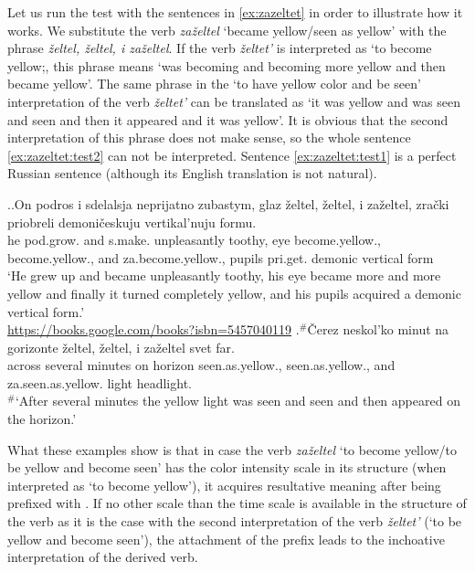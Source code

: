 Let us run the test with the sentences in \ref{ex:zazeltet} in order to illustrate how it works. We substitute the verb \textit{za\v{z}eltel} `became yellow/seen as yellow' with the phrase \textit{\v{z}eltel, \v{z}eltel, i za\v{z}eltel}. If the verb \textit{\v{z}eltet'} is interpreted as `to become yellow;, this phrase means `was becoming and becoming more yellow and then became yellow'. The same phrase in the `to have yellow color and be seen' interpretation of the verb \textit{\v{z}eltet'} can be translated as `it was yellow and was seen and seen and then it appeared and it was yellow'. It is obvious that the second interpretation of this phrase does not make sense, so the whole sentence \ref{ex:zazeltet:test2} can not be interpreted. Sentence \ref{ex:zazeltet:test1} is a perfect Russian sentence (although its English translation is not natural).

\ex.\label{ex:zazeltet:test}\ag.\label{ex:zazeltet:test1}On podros i sdelalsja neprijatno zubastym, glaz \v{z}eltel, \v{z}eltel, i za\v{z}eltel, zra\v{c}ki priobreli demoni\v{c}eskuju vertikal'nuju formu.\\
he pod.grow. and s.make. unpleasantly toothy, eye become.yellow., become.yellow., and za.become.yellow., pupils pri.get. demonic vertical form\\
\trans `He grew up and became unpleasantly toothy, his eye became more and more yellow and finally it turned completely yellow, and his pupils acquired a demonic vertical form.'\\\hbox{}\hfill\hbox{\url{https://books.google.com/books?isbn=5457040119}}
\bg.$^\#$\v{C}erez neskol'ko minut na gorizonte \v{z}eltel, \v{z}eltel, i za\v{z}eltel svet far.\label{ex:zazeltet:test2}\\
across several minutes on horizon seen.as.yellow., seen.as.yellow., and za.seen.as.yellow. light headlight.\\
\trans $^\#$`After several minutes the yellow light was seen and seen and then appeared on the horizon.'

What these examples show is that in case the verb \textit{za\v{z}eltel} `to become yellow/to be yellow and become seen' has the color intensity scale in its structure (when interpreted as `to become yellow'), it acquires resultative meaning after being prefixed with . If no other scale than the time scale is available in the structure of the verb as it is the case with the second interpretation of the verb \textit{\v{z}eltet'} (`to be yellow and become seen'), the attachment of the prefix  leads to the inchoative interpretation of the derived verb.

